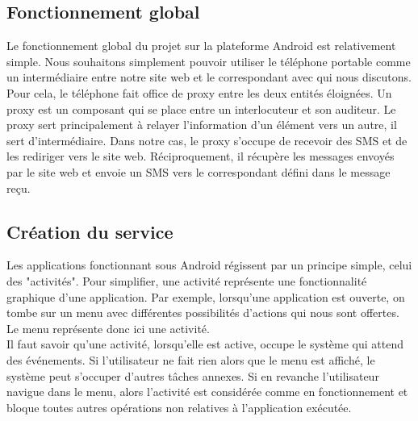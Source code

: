 \subsection{Fonctionnement global}

Le fonctionnement global du projet sur la plateforme Android est relativement simple. Nous souhaitons
simplement pouvoir utiliser le téléphone portable comme un intermédiaire entre notre site web et le 
correspondant avec qui nous discutons. Pour cela, le téléphone fait office de proxy entre les deux 
entités éloignées. Un proxy est un composant qui se place entre un interlocuteur et son auditeur. Le 
proxy sert principalement à relayer l'information d'un élément vers un autre, il sert d'intermédiaire.
Dans notre cas, le proxy s'occupe de recevoir des SMS et de les rediriger vers le site web. 
Réciproquement, il récupère les messages envoyés par le site web et envoie un SMS vers le correspondant
défini  dans le message reçu.



\subsection{Création du service}

Les applications fonctionnant sous Android régissent par un principe simple, celui des "activités".
Pour simplifier, une activité représente une fonctionnalité graphique d'une application. Par exemple,
lorsqu'une application est ouverte, on tombe sur un menu avec différentes possibilités d'actions 
qui nous sont offertes. Le menu représente donc ici une activité.
\\


Il faut savoir qu'une activité, lorsqu'elle est active, occupe le système qui attend des événements.
Si l'utilisateur ne fait rien alors que le menu est affiché, le système peut s'occuper d'autres 
tâches annexes. Si en revanche l'utilisateur navigue dans le menu, alors l'activité est considérée
comme en fonctionnement et bloque toutes autres opérations non relatives à l'application exécutée.
\\


